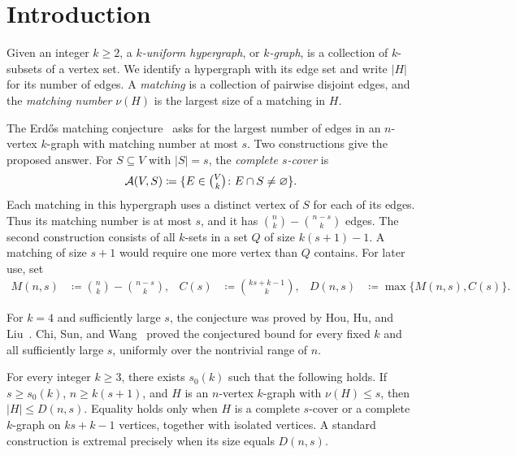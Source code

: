 \section{Introduction}\label{sec:introduction}

Given an integer $k\ge2$, a \emph{$k$-uniform hypergraph}, or \emph{$k$-graph}, is a collection of $k$-subsets of a vertex set. We identify a hypergraph with its edge set and write $|H|$ for its number of edges. A \emph{matching} is a collection of pairwise disjoint edges, and the \emph{matching number} $\nu(H)$ is the largest size of a matching in $H$.

The Erd\H{o}s matching conjecture~\cite[equation (9)]{Erdos1965} asks for the largest number of edges in an $n$-vertex $k$-graph with matching number at most $s$. Two constructions give the proposed answer. For $S\subseteq V$ with $|S|=s$, the \emph{complete $s$-cover} is
\begin{align*}
\mathcal A(V,S)\coloneqq\{E\in\tbinom Vk\colon E\cap S\ne\varnothing\}.
\end{align*}
Each matching in this hypergraph uses a distinct vertex of $S$ for each of its edges. Thus its matching number is at most $s$, and it has $\binom nk-\binom{n-s}k$ edges. The second construction consists of all $k$-sets in a set $Q$ of size $k(s+1)-1$. A matching of size $s+1$ would require one more vertex than $Q$ contains. For later use, set
\begin{align}
M(n,s)&\coloneqq\binom nk-\binom{n-s}k, &
C(s)&\coloneqq\binom{ks+k-1}k, &
D(n,s)&\coloneqq\max\{M(n,s),C(s)\}.
\label{eq:matching-counts}
\end{align}

For $k=4$ and sufficiently large $s$, the conjecture was proved by Hou, Hu, and Liu~\cite{HHL2026}. Chi, Sun, and Wang~\cite[Theorem 1.4]{CSW2026} proved the conjectured bound for every fixed $k$ and all sufficiently large $s$, uniformly over the nontrivial range of $n$.
\begin{theorem}\label{thm:matching}
For every integer $k\ge3$, there exists $s_0(k)$ such that the following holds. If $s\ge s_0(k)$, $n\ge k(s+1)$, and $H$ is an $n$-vertex $k$-graph with $\nu(H)\le s$, then $|H|\le D(n,s)$. Equality holds only when $H$ is a complete $s$-cover or a complete $k$-graph on $ks+k-1$ vertices, together with isolated vertices. A standard construction is extremal precisely when its size equals $D(n,s)$.
\end{theorem}


